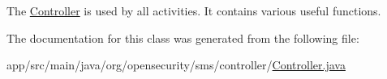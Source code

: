 The \hyperlink{a00006}{Controller} is used by all activities. It contains various useful functions. 

The documentation for this class was generated from the following file\+:\begin{DoxyCompactItemize}
\item 
app/src/main/java/org/opensecurity/sms/controller/\hyperlink{a00016}{Controller.\+java}\end{DoxyCompactItemize}
